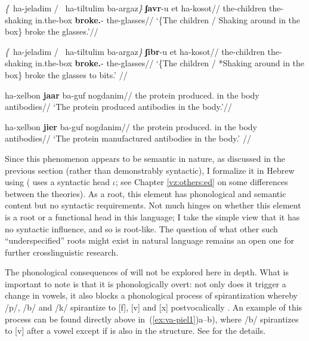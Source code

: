 \pex \label{ex:va-piel1}
	\a \begingl
		\gla \emph{\{}\cmark~ha-jeladim / \cmark~ha-tiltulim ba-argaz\emph{\}} \textbf{ʃavr}-u et ha-kosot//
		\glb \phantom{\{\cmark~}the-children {} \phantom{\cmark~}the-shaking in.the-box \textbf{broke.}-  the-glasses//
		\glft `\{The children / Shaking around in the box\} broke the glasses.'//
		\endgl
	
	\a \begingl
		\gla \emph{\{}\cmark~ha-jeladim / \xmark~ha-tiltulim ba-argaz\emph{\}} \textbf{ʃibr}-u et ha-kosot//
		\glb \phantom{\{\cmark~}the-children {} \phantom{\xmark~}the-shaking in.the-box \textbf{broke.}-  the-glasses//
		\glft `\{The children / *Shaking around in the box\} broke the glasses to bits.' //
		\endgl
\xe

\pex \label{ex:va-piel2}
	\a \begingl
		\gla ha-xelbon \textbf{ja{\texttslig}ar} ba-guf nogdanim//
		\glb the protein produced. in the body antibodies//
		\glft `The protein produced antibodies in the body.'//
	\endgl
	
	\a \begingl 
	\gla ha-xelbon \textbf{ji{\texttslig}er} ba-guf nogdanim//
	\glb the protein produced. in the body antibodies//
	\glft `The protein manufactured antibodies in the body.' //
	\endgl
\xe

Since this phenomenon appears to be semantic in nature, as discussed in the previous section (rather than demonstrably syntactic), I formalize it in Hebrew using {\va} (\citealt{doron03} uses a syntactic head $\iota$; see Chapter \ref{vz:others:ed} on some differences between the theories). As a root, this element has phonological and semantic content but no syntactic requirements. Not much hinges on whether this element is a root or a functional head in this language; I take the simple view that it has no syntactic influence, and so is root-like. The question of what other such ``underspecified'' roots might exist in natural language remains an open one for further crosslinguistic research.

The phonological consequences of {\va} will not be explored here in depth. What is important to note is that it is phonologically overt: not only does it trigger a change in vowels, it also blocks a phonological process of spirantization whereby /p/, /b/ and /k/ spirantize to [f], [v] and [x] postvocalically \citep{adam02,temkinmartinez08wccfl,temkinmartinzemuellner16,gouskova12nllt}. An example of this process can be found directly above in~(\ref{ex:va-piel1})a--b), where /b/ spirantizes to [v] after a vowel except if {\va} is also in the structure. See \cite{kastner18nllt} for the details.

